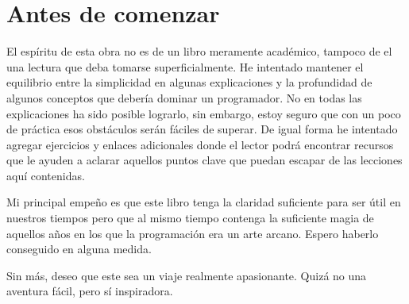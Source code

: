 \thispagestyle{empty}

\chapter{Antes de comenzar}


El espíritu de esta obra no es de un libro meramente académico, tampoco de el una lectura que deba tomarse superficialmente. He intentado mantener el equilibrio entre la simplicidad en algunas explicaciones y la profundidad de algunos conceptos que debería dominar un programador. No en todas las explicaciones ha sido posible lograrlo, sin embargo, estoy seguro que con un poco de práctica esos obstáculos serán fáciles de superar. De igual forma he intentado agregar ejercicios y enlaces adicionales donde el lector podrá encontrar recursos que le ayuden a aclarar aquellos puntos clave que puedan escapar de las lecciones aquí contenidas.

Mi principal empeño es que este libro tenga la claridad suficiente para ser útil en nuestros tiempos pero que al mismo tiempo contenga la suficiente magia de aquellos años en los que la programación era un arte arcano. Espero haberlo conseguido en alguna medida.

Sin más, deseo que este sea un viaje realmente apasionante. Quizá no una aventura fácil, pero sí inspiradora. 



